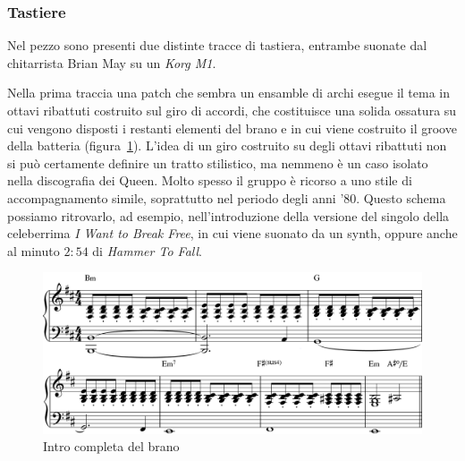 \documentclass[12pt]{article}
\begin{document}
\subsubsection{Tastiere}
Nel pezzo sono presenti due distinte tracce di tastiera, entrambe suonate dal chitarrista Brian May su un \emph{Korg M1}.

Nella prima traccia una patch che sembra un ensamble di archi esegue il tema in ottavi ribattuti costruito sul giro di accordi, che costituisce una solida ossatura su cui vengono disposti i restanti elementi del brano e in cui viene costruito il groove della batteria (figura~\ref{fig:key1}). L'idea di un giro costruito su degli ottavi ribattuti non si può certamente definire un tratto stilistico, ma nemmeno è un caso isolato nella discografia dei Queen. Molto spesso il gruppo è ricorso a uno stile di accompagnamento simile, soprattutto nel periodo degli anni '\(80\). Questo schema possiamo ritrovarlo, ad esempio, nell'introduzione della versione del singolo della celeberrima \emph{I Want to Break Free}, in cui viene suonato da un synth, oppure anche al minuto \(2:54\) di \emph{Hammer To Fall}.

\begin{figure}[H]
 \centering
 \includegraphics[width=\textwidth,keepaspectratio]{keys/key1}
 \caption{Intro completa del brano}
 \label{fig:key1}
\end{figure}
\end{document}
